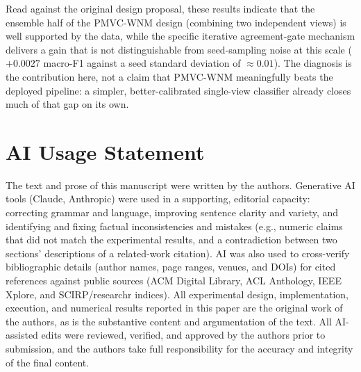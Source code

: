 \documentclass[conference]{IEEEtran}
\begin{document}
Read against the original design proposal, these results indicate that the
ensemble half of the PMVC-WNM design (combining two independent views) is well
supported by the data, while the specific iterative agreement-gate mechanism
delivers a gain that is not distinguishable from seed-sampling noise at this
scale ($+0.0027$ macro-F1 against a seed standard deviation of $\approx
0.01$). The diagnosis is the contribution here, not a claim that PMVC-WNM
meaningfully beats the deployed pipeline: a simpler, better-calibrated
single-view classifier already closes much of that gap on its own.

\section*{AI Usage Statement}
The text and prose of this manuscript were written by the authors.
Generative AI tools (Claude, Anthropic) were used in a supporting, editorial
capacity: correcting grammar and language, improving sentence clarity and
variety, and identifying and fixing factual inconsistencies and mistakes
(e.g., numeric claims that did not match the experimental results, and a
contradiction between two sections' descriptions of a related-work
citation). AI was also used to cross-verify bibliographic details (author
names, page ranges, venues, and DOIs) for cited references against public
sources (ACM Digital Library, ACL Anthology, IEEE Xplore, and
SCIRP/researchr indices). All experimental design, implementation,
execution, and numerical results reported in this paper are the original
work of the authors, as is the substantive content and argumentation of the
text. All AI-assisted edits were reviewed, verified, and approved by the
authors prior to submission, and the authors take full responsibility for
the accuracy and integrity of the final content.


\end{document}
